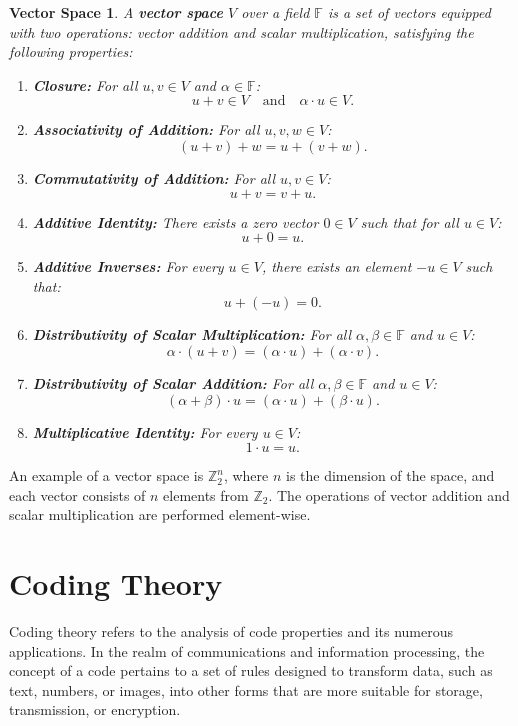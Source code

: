 \newtheorem*{vsp}{Vector Space}
\begin{vsp}
A \textbf{vector space} $V$ over a field $\mathbb{F}$ is a set of vectors equipped with two operations: vector addition and scalar multiplication, satisfying the following properties:

\begin{enumerate}
    \item \textbf{Closure:} For all $u, v \in V$ and $\alpha \in \mathbb{F}$:
    \[
    u + v \in V \quad \text{and} \quad \alpha \cdot u \in V.
    \]
    
    \item \textbf{Associativity of Addition:} For all $u, v, w \in V$:
    \[
    (u + v) + w = u + (v + w).
    \]
    
    \item \textbf{Commutativity of Addition:} For all $u, v \in V$:
    \[
    u + v = v + u.
    \]
    
    \item \textbf{Additive Identity:} There exists a zero vector $0 \in V$ such that for all $u \in V$:
    \[
    u + 0 = u.
    \]
    
    \item \textbf{Additive Inverses:} For every $u \in V$, there exists an element $-u \in V$ such that:
    \[
    u + (-u) = 0.
    \]
    
    \item \textbf{Distributivity of Scalar Multiplication:} For all $\alpha, \beta \in \mathbb{F}$ and $u \in V$:
    \[
    \alpha \cdot (u + v) = (\alpha \cdot u) + (\alpha \cdot v).
    \]
    
    \item \textbf{Distributivity of Scalar Addition:} For all $\alpha, \beta \in \mathbb{F}$ and $u \in V$:
    \[
    (\alpha + \beta) \cdot u = (\alpha \cdot u) + (\beta \cdot u).
    \]
    
    \item \textbf{Multiplicative Identity:} For every $u \in V$:
    \[
    1 \cdot u = u.
    \]
\end{enumerate}
\end{vsp}

An example of a vector space is $\mathbb{Z}_2^n$, where $n$ is the dimension of the space, and each vector consists of $n$ elements from $\mathbb{Z}_2$. The operations of vector addition and scalar multiplication are performed element-wise.


\section{Coding Theory}
Coding theory refers to the analysis of code properties and its numerous applications. In the realm of communications and information processing, the concept of a code pertains to a set of rules designed to transform data, such as text, numbers, or images, into other forms that are more suitable for storage, transmission, or encryption.

